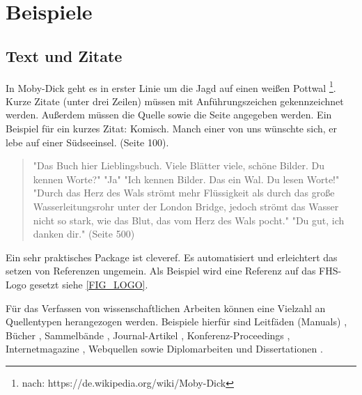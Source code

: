 \chapter{Beispiele}

\thispagestyle{standard}
\pagestyle{standard}

\section{Text und Zitate}

In Moby-Dick geht es in erster Linie um die Jagd auf einen weißen Pottwal \footnote{nach: https://de.wikipedia.org/wiki/Moby-Dick}. Kurze Zitate (unter drei Zeilen) müssen mit Anführungszeichen gekennzeichnet werden. Außerdem müssen die Quelle sowie die Seite angegeben werden. Ein Beispiel für ein kurzes Zitat: \glqq Komisch. Manch einer von uns wünschte sich, er lebe auf einer Südseeinsel.\grqq \cite{MELVILLE:MOBYDICK1997} (Seite 100).

  \begin{quote}
"Das Buch hier Lieblingsbuch. Viele Blätter viele, schöne Bilder. Du kennen Worte?"\newline
"Ja"\newline
"Ich kennen Bilder. Das ein Wal. Du lesen Worte!"\newline
"Durch das Herz des Wals strömt mehr Flüssigkeit als durch das große Wasserleitungsrohr unter der London Bridge, jedoch strömt das Wasser nicht so stark, wie das Blut, das vom Herz des Wals pocht."\newline
"Du gut, ich danken dir."  \upshape \cite{MELVILLE:MOBYDICK1997} (Seite 500)
  \end{quote}

Ein sehr praktisches Package ist cleveref. Es automatisiert und erleichtert das setzen von Referenzen ungemein. Als Beispiel wird eine Referenz auf das FHS-Logo gesetzt siehe \cref{FIG_LOGO}.

Für das Verfassen von wissenschaftlichen Arbeiten können eine Vielzahl an Quellentypen herangezogen werden. Beispiele hierfür sind Leitfäden (Manuals) \citep{RFC2828} \citep{80211i} \citep{80211} \cite{X800} \citep{TR102377} \citep{EN301893} \citep{PUB197} \citep{PUB74}, Bücher \citep{Fis04a} \citep{Rei05a} \citep{Tan00a} \citep{Ste04a} \citep{GMS00a} \citep{HL98a}, Sammelbände \citep{EHL00a} \citep{Sch94a}, Journal-Artikel \citep{TM03a} \citep{CP03a}, Konferenz-Proceedings \citep{HCB00a} \citep{KBW04a} \citep{KSW04a} \citep{HK05a}, Internetmagazine \citep{Eke05a}, Webquellen \cite{nist} \cite{php} \cite{BDKMT93a} \cite{IDSSM} sowie Diplomarbeiten und Dissertationen \citep{Sch98} \cite{Hae94a}.

